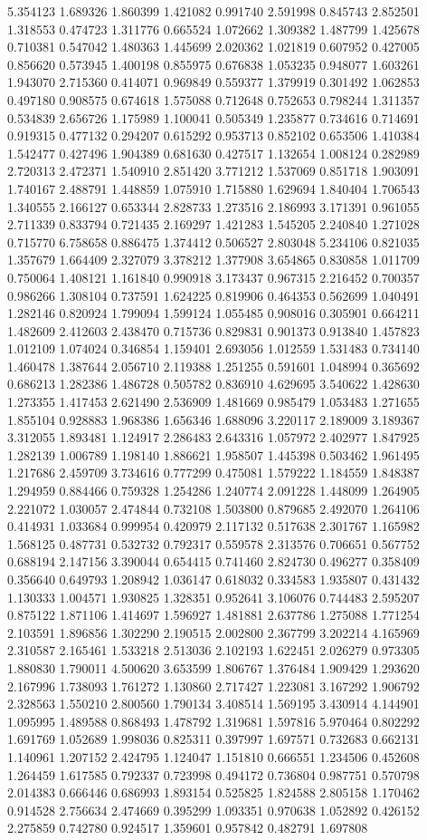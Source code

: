 5.354123
1.689326
1.860399
1.421082
0.991740
2.591998
0.845743
2.852501
1.318553
0.474723
1.311776
0.665524
1.072662
1.309382
1.487799
1.425678
0.710381
0.547042
1.480363
1.445699
2.020362
1.021819
0.607952
0.427005
0.856620
0.573945
1.400198
0.855975
0.676838
1.053235
0.948077
1.603261
1.943070
2.715360
0.414071
0.969849
0.559377
1.379919
0.301492
1.062853
0.497180
0.908575
0.674618
1.575088
0.712648
0.752653
0.798244
1.311357
0.534839
2.656726
1.175989
1.100041
0.505349
1.235877
0.734616
0.714691
0.919315
0.477132
0.294207
0.615292
0.953713
0.852102
0.653506
1.410384
1.542477
0.427496
1.904389
0.681630
0.427517
1.132654
1.008124
0.282989
2.720313
2.472371
1.540910
2.851420
3.771212
1.537069
0.851718
1.903091
1.740167
2.488791
1.448859
1.075910
1.715880
1.629694
1.840404
1.706543
1.340555
2.166127
0.653344
2.828733
1.273516
2.186993
3.171391
0.961055
2.711339
0.833794
0.721435
2.169297
1.421283
1.545205
2.240840
1.271028
0.715770
6.758658
0.886475
1.374412
0.506527
2.803048
5.234106
0.821035
1.357679
1.664409
2.327079
3.378212
1.377908
3.654865
0.830858
1.011709
0.750064
1.408121
1.161840
0.990918
3.173437
0.967315
2.216452
0.700357
0.986266
1.308104
0.737591
1.624225
0.819906
0.464353
0.562699
1.040491
1.282146
0.820924
1.799094
1.599124
1.055485
0.908016
0.305901
0.664211
1.482609
2.412603
2.438470
0.715736
0.829831
0.901373
0.913840
1.457823
1.012109
1.074024
0.346854
1.159401
2.693056
1.012559
1.531483
0.734140
1.460478
1.387644
2.056710
2.119388
1.251255
0.591601
1.048994
0.365692
0.686213
1.282386
1.486728
0.505782
0.836910
4.629695
3.540622
1.428630
1.273355
1.417453
2.621490
2.536909
1.481669
0.985479
1.053483
1.271655
1.855104
0.928883
1.968386
1.656346
1.688096
3.220117
2.189009
3.189367
3.312055
1.893481
1.124917
2.286483
2.643316
1.057972
2.402977
1.847925
1.282139
1.006789
1.198140
1.886621
1.958507
1.445398
0.503462
1.961495
1.217686
2.459709
3.734616
0.777299
0.475081
1.579222
1.184559
1.848387
1.294959
0.884466
0.759328
1.254286
1.240774
2.091228
1.448099
1.264905
2.221072
1.030057
2.474844
0.732108
1.503800
0.879685
2.492070
1.264106
0.414931
1.033684
0.999954
0.420979
2.117132
0.517638
2.301767
1.165982
1.568125
0.487731
0.532732
0.792317
0.559578
2.313576
0.706651
0.567752
0.688194
2.147156
3.390044
0.654415
0.741460
2.824730
0.496277
0.358409
0.356640
0.649793
1.208942
1.036147
0.618032
0.334583
1.935807
0.431432
1.130333
1.004571
1.930825
1.328351
0.952641
3.106076
0.744483
2.595207
0.875122
1.871106
1.414697
1.596927
1.481881
2.637786
1.275088
1.771254
2.103591
1.896856
1.302290
2.190515
2.002800
2.367799
3.202214
4.165969
2.310587
2.165461
1.533218
2.513036
2.102193
1.622451
2.026279
0.973305
1.880830
1.790011
4.500620
3.653599
1.806767
1.376484
1.909429
1.293620
2.167996
1.738093
1.761272
1.130860
2.717427
1.223081
3.167292
1.906792
2.328563
1.550210
2.800560
1.790134
3.408514
1.569195
3.430914
4.144901
1.095995
1.489588
0.868493
1.478792
1.319681
1.597816
5.970464
0.802292
1.691769
1.052689
1.998036
0.825311
0.397997
1.697571
0.732683
0.662131
1.140961
1.207152
2.424795
1.124047
1.151810
0.666551
1.234506
0.452608
1.264459
1.617585
0.792337
0.723998
0.494172
0.736804
0.987751
0.570798
2.014383
0.666446
0.686993
1.893154
0.525825
1.824588
2.805158
1.170462
0.914528
2.756634
2.474669
0.395299
1.093351
0.970638
1.052892
0.426152
2.275859
0.742780
0.924517
1.359601
0.957842
0.482791
1.697808
